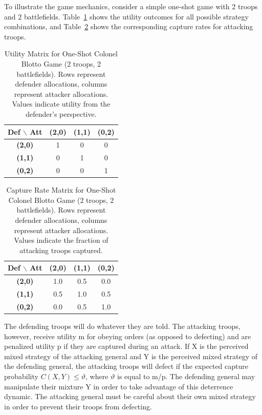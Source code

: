 \documentclass[letterpaper, 10 pt, conference]{ieeeconf}  %
\begin{document}
To illustrate the game mechanics, consider a simple one-shot game with 2 troops and 2 battlefields. Table~\ref{table_utility} shows the utility outcomes for all possible strategy combinations, and Table~\ref{table_capture} shows the corresponding capture rates for attacking troops.

\begin{table}[htbp]
\caption{Utility Matrix for One-Shot Colonel Blotto Game (2 troops, 2 battlefields). Rows represent defender allocations, columns represent attacker allocations. Values indicate utility from the defender's perspective.}
\label{table_utility}
\begin{center}
\begin{tabular}{|c||c|c|c|}
\hline
\textbf{Def $\backslash$ Att} & \textbf{(2,0)} & \textbf{(1,1)} & \textbf{(0,2)} \\
\hline
\hline
\textbf{(2,0)} & 1 & 0 & 0 \\
\hline
\textbf{(1,1)} & 0 & 1 & 0 \\
\hline
\textbf{(0,2)} & 0 & 0 & 1 \\
\hline
\end{tabular}
\end{center}
\end{table}

\begin{table}[htbp]
\caption{Capture Rate Matrix for One-Shot Colonel Blotto Game (2 troops, 2 battlefields). Rows represent defender allocations, columns represent attacker allocations. Values indicate the fraction of attacking troops captured.}
\label{table_capture}
\begin{center}
\begin{tabular}{|c||c|c|c|}
\hline
\textbf{Def $\backslash$ Att} & \textbf{(2,0)} & \textbf{(1,1)} & \textbf{(0,2)} \\
\hline
\hline
\textbf{(2,0)} & 1.0 & 0.5 & 0.0 \\
\hline
\textbf{(1,1)} & 0.5 & 1.0 & 0.5 \\
\hline
\textbf{(0,2)} & 0.0 & 0.5 & 1.0 \\
\hline
\end{tabular}
\end{center}
\end{table}

The defending troops will do whatever they are told. The attacking troops, however, receive utility m for obeying orders (as opposed to defecting) and are penalized utility p if they are captured during an attack. If X is the perceived mixed strategy of the attacking general and Y is the perceived mixed strategy of the defending general, the attacking troops will defect if the expected capture probability $C(X, Y) \leq \vartheta$, where $\vartheta$ is equal to m/p. The defending general may manipulate their mixture Y in order to take advantage of this deterrence dynamic. The attacking general must be careful about their own mixed strategy in order to prevent their troops from defecting.
\end{document}
